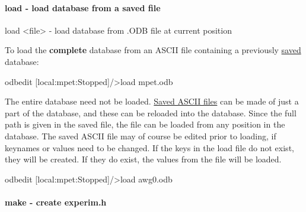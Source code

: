 \hypertarget{RC_odbedit_examples_RC_odbedit_load}{}\paragraph{load -\/ load database from a saved file}\label{RC_odbedit_examples_RC_odbedit_load}

\begin{DoxyCode}
load <file>             - load database from .ODB file at current position
\end{DoxyCode}
 To load the {\bfseries complete} database from an ASCII file containing a previously \hyperlink{RC_odbedit_examples_RC_odbedit_save}{saved} database: 
\begin{DoxyCode}
 odbedit
[local:mpet:Stopped]/>load mpet.odb
\end{DoxyCode}
 The entire database need not be loaded. \hyperlink{RC_odbedit_examples_RC_odbedit_save}{Saved ASCII files} can be made of just a part of the database, and these can be reloaded into the database. Since the full path is given in the saved file, the file can be loaded from any position in the database. The saved ASCII file may of course be edited prior to loading, if keynames or values need to be changed. If the keys in the load file do not exist, they will be created. If they do exist, the values from the file will be loaded. 
\begin{DoxyCode}
 odbedit
[local:mpet:Stopped]/>load awg0.odb
\end{DoxyCode}
 \par


\label{RC_odbedit_examples_idx_experim-dot-h_make}
\hypertarget{RC_odbedit_examples_idx_experim-dot-h_make}{}
 

\hypertarget{RC_odbedit_examples_RC_odbedit_make}{}\paragraph{make -\/ create experim.h}\label{RC_odbedit_examples_RC_odbedit_make}

